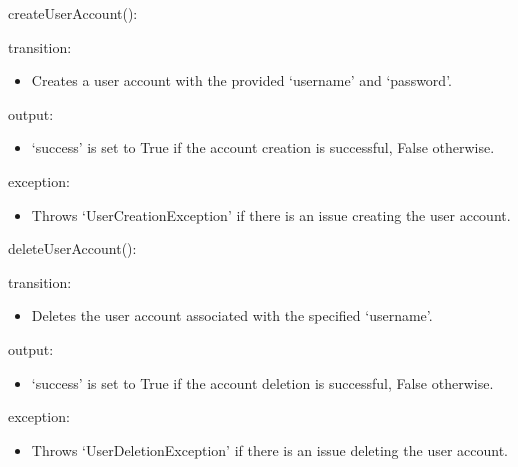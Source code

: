 \documentclass[12pt, titlepage]{article}
\begin{document}
\noindent createUserAccount():
\begin{itemize}
  \begin{item}
    transition:
    \begin{itemize}
      \item Creates a user account with the provided `username' and `password'.
    \end{itemize}
  \end{item}
  \begin{item}
    output:
    \begin{itemize}
      \item `success' is set to True if the account creation is successful,
        False otherwise.
    \end{itemize}
  \end{item}
  \begin{item}
    exception:
    \begin{itemize}
      \item Throws `UserCreationException' if there is an issue creating the
        user account.
    \end{itemize}
  \end{item}
\end{itemize}

\noindent deleteUserAccount():
  \begin{itemize}
    \begin{item}
      transition:
      \begin{itemize}
        \item Deletes the user account associated with the specified `username'.
      \end{itemize}
    \end{item}
    \begin{item}
      output:
      \begin{itemize}
        \item `success' is set to True if the account deletion is successful,
          False otherwise.
      \end{itemize}
    \end{item}
    \begin{item}
      exception:
      \begin{itemize}
        \item Throws `UserDeletionException' if there is an issue deleting the
          user account.
      \end{itemize}
    \end{item}
\end{itemize}
\end{document}
